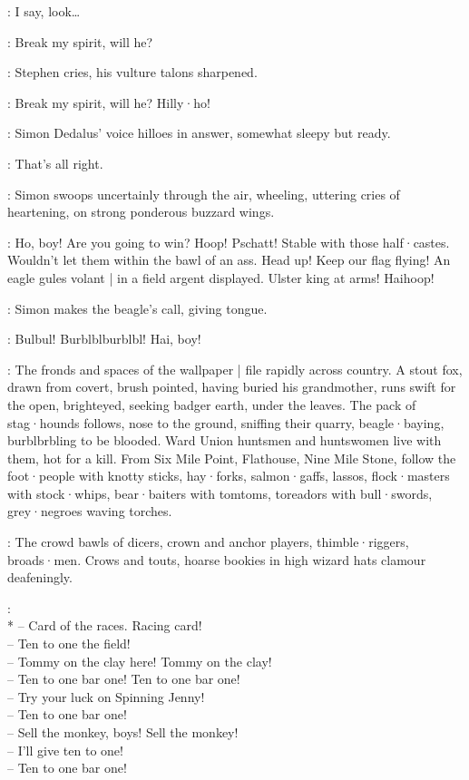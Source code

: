 \Bloom:
I say,
look…

\Stephen:
Break my spirit,
will he?

:
Stephen cries,
his vulture talons sharpened.

\Stephen:
Break my spirit,
will he?
Hilly·ho!

:
Simon Dedalus' voice hilloes in answer,
somewhat sleepy but ready.

\Simon:
That's all right.

:
Simon swoops uncertainly through the air,
wheeling,
uttering cries of heartening,
on strong ponderous buzzard wings.

\Simon:
Ho,
boy!
Are you going to win?
Hoop!
Pschatt!
Stable with those half·castes.
Wouldn't let them within the bawl of an ass.
Head up!
Keep our flag flying!
An eagle gules volant |
in a field argent displayed.
Ulster king at arms!
Haihoop!

:
Simon makes the beagle's call,
giving tongue.

\Simon:
Bulbul!
Burblblburblbl!
Hai,
boy!

:
The fronds and spaces of the wallpaper |
file rapidly across country.
A stout fox,
drawn from covert,
brush pointed,
having buried his grandmother,
runs swift for the open,
brighteyed,
seeking badger earth,
under the leaves.
The pack of stag·hounds follows,
nose to the ground,
sniffing their quarry,
beagle·baying,
burblbrbling to be blooded.
Ward Union huntsmen and huntswomen live with them,
hot for a kill.
From Six Mile Point,
Flathouse,
Nine Mile Stone,
follow the foot·people with knotty sticks,
hay·forks,
salmon·gaffs,
lassos,
flock·masters with stock·whips,
bear·baiters with tomtoms,
toreadors with bull·swords,
grey·negroes waving torches.

:
The crowd bawls of dicers,
crown and anchor players,
thimble·riggers,
broads·men.
Crows and touts,
hoarse bookies in high wizard hats clamour deafeningly.

\Crowd:\\*
-- Card of the races. Racing card!\\
-- Ten to one the field!\\
-- Tommy on the clay here! Tommy on the clay!\\
-- Ten to one bar one! Ten to one bar one!\\
-- Try your luck on Spinning Jenny!\\
-- Ten to one bar one!%
\\
-- Sell the monkey, boys! Sell the monkey!\\
-- I'll give ten to one!\\
-- Ten to one bar one!

